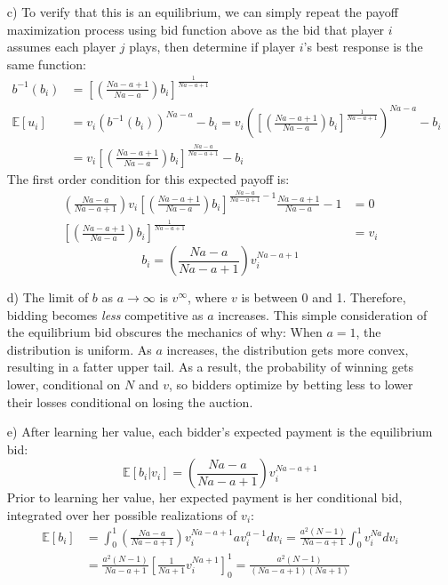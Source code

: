 \documentclass{article}
\newcommand{\E}[1]{\mathbb{E}\left[#1\right]} %
\begin{document}
\begin{itemize}
	\item[c)] To verify that this is an equilibrium, we can simply repeat the payoff maximization process using bid function above as the bid that player $i$ assumes each player $j$ plays, then determine if player $i$'s best response is the same function:
		\begin{align*}
			b^{-1}(b_i)	&= \left[\left(\frac{Na-a+1}{Na-a}\right)b_i\right]^{\frac{1}{Na-a+1}}	\\
				\E{u_i} &= v_i\left(b^{-1}(b_i)\right)^{Na-a} - b_i 
						= v_i\left(\left[\left(\frac{Na-a+1}{Na-a}\right)b_i\right]^{\frac{1}{Na-a+1}}\right)^{Na-a} - b_i	\\
						&= v_i\left[\left(\frac{Na-a+1}{Na-a}\right)b_i\right]^{\frac{Na-a}{Na-a+1}} - b_i
		\end{align*}
		The first order condition for this expected payoff is:
		\begin{align*}
			\left(\frac{Na-a}{Na-a+1}\right)v_i\left[\left(\frac{Na-a+1}{Na-a}\right)b_i\right]^{\frac{Na-a}{Na-a+1}-1}\frac{Na-a+1}{Na-a} - 1 &= 0	\\
			\left[\left(\frac{Na-a+1}{Na-a}\right)b_i\right]^{\frac{1}{Na-a+1}}	&= v_i
		\end{align*}
		\[
			b_i = \left(\frac{Na-a}{Na-a+1}\right)v_i^{Na-a+1}
		\]
		
	\pagebreak 
	\item[d)] The limit of $b$ as ${a\rightarrow\infty}$ is $v^\infty$, where $v$ is between 0 and 1. Therefore, bidding becomes \textit{less} competitive as $a$ increases. This simple consideration of the equilibrium bid obscures the mechanics of why: When ${a=1}$, the distribution is uniform. As $a$ increases, the distribution gets more convex, resulting in a fatter upper tail. As a result, the probability of winning gets lower, conditional on $N$ and $v$, so bidders optimize by betting less to lower their losses conditional on losing the auction.


	\item[e)] After learning her value, each bidder's expected payment is the equilibrium bid:
		\[
			\E{b_i|v_i} = \left(\frac{Na-a}{Na-a+1}\right)v_i^{Na-a+1}
		\]
		Prior to learning her value, her expected payment is her conditional bid, integrated over her possible realizations of $v_i$:
		\begin{align*}
			\E{b_i}	&= \int_0^1\left(\frac{Na-a}{Na-a+1}\right)v_i^{Na-a+1}av_i^{a-1}dv_i = \frac{a^2(N-1)}{Na-a+1}\int_0^1v_i^{Na}dv_i	\\
					&= \frac{a^2(N-1)}{Na-a+1}\left[\frac{1}{Na+1}v_i^{Na+1}\right]^1_0 = \frac{a^2(N-1)}{(Na-a+1)(Na+1)}
		\end{align*}

\end{itemize}
\end{document}
